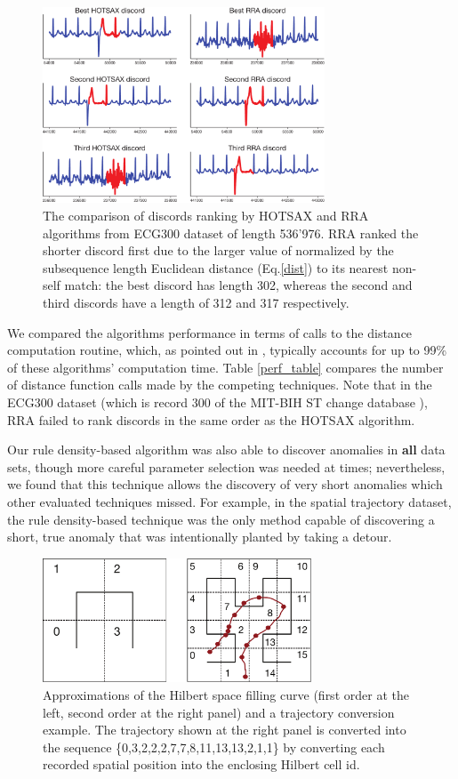 \documentclass{sig-alternate}
\begin{document}
\begin{figure}[t]   
   \centering
   \includegraphics[width=84mm]{ECG300.pdf}
   \caption{The comparison of discords ranking by HOTSAX and RRA algorithms from ECG300 dataset of length 536'976. RRA ranked the shorter discord first due to the larger value of normalized by the subsequence length Euclidean distance (Eq.\eqref{dist}) to its nearest non-self match: the best discord has length 302, whereas the second and third discords have a length of 312 and 317 respectively.}
   \label{fig:ecg300}
\end{figure}

We compared the algorithms performance in terms of calls to the distance computation routine, which, as pointed out in \cite{hot_sax}, typically accounts for up to 99\% of these algorithms' computation time. Table \ref{perf_table} compares the number of distance function calls made by the competing techniques. Note that in the ECG300 dataset (which is record 300 of the MIT-BIH ST change database \cite{physionet}), RRA failed to rank discords in the same order as the HOTSAX algorithm. 

Our rule density-based algorithm was also able to discover anomalies in \textbf{all} data sets, though more careful parameter selection was needed at times; nevertheless, we found that this technique allows the discovery of very short anomalies which other evaluated techniques missed. For example, in the spatial trajectory dataset, the rule density-based technique was the only method capable of discovering a short, true anomaly that was intentionally planted by taking a detour.

\begin{figure}[t]
   \centering
   \includegraphics[width=80mm]{hilbert.pdf}
   \caption{Approximations of the Hilbert space filling curve (first order at the left, second order at the right panel) and a trajectory conversion example. The trajectory shown at the right panel is converted into the sequence \{0,3,2,2,2,7,7,8,11,13,13,2,1,1\} by converting each recorded spatial position into the enclosing Hilbert cell id.}   
   \label{fig:hilbert}
\end{figure}
\end{document}
